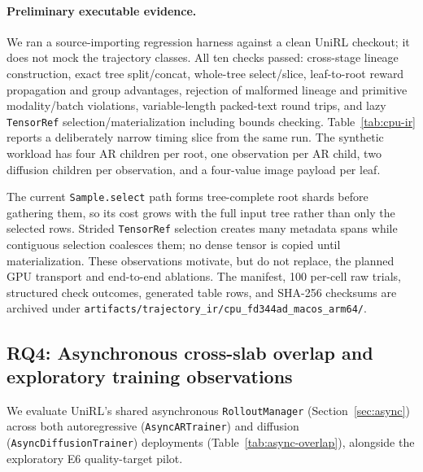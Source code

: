 \documentclass[10pt]{article}
\newcommand{\codepath}[1]{\texttt{#1}}
\begin{document}
\paragraph{Preliminary executable evidence.}
We ran a source-importing regression harness against a clean UniRL checkout; it does not mock the trajectory classes.
All ten checks passed: cross-stage lineage construction, exact tree split/concat,
whole-tree select/slice, leaf-to-root reward propagation and group advantages,
rejection of malformed lineage and primitive modality/batch violations, variable-length packed-text
round trips, and lazy \texttt{TensorRef} selection/materialization including bounds
checking.
Table~\ref{tab:cpu-ir} reports a deliberately narrow timing slice from the same run.
The synthetic workload has four AR children per root, one observation per AR child,
two diffusion children per observation, and a four-value image payload per leaf.

\begin{table}[H]
\caption{Preliminary single-process CPU trajectory-IR timings (microseconds).
Python 3.12.13 and PyTorch 2.11.0; one thread; ten warm-up and 100 measured repetitions.
These are regression measurements, not distributed or GPU throughput.}
\label{tab:cpu-ir}
\centering
\scriptsize

\end{table}

The current \texttt{Sample.select} path forms tree-complete root shards before
gathering them, so its cost grows with the full input tree rather than only the
selected rows. Strided \texttt{TensorRef} selection creates many metadata spans
while contiguous selection coalesces them; no dense tensor is copied until
materialization. These observations motivate, but do not replace, the planned
GPU transport and end-to-end ablations. The manifest, 100 per-cell raw trials,
structured check outcomes, generated table rows, and SHA-256 checksums are archived
under \codepath{artifacts/trajectory\_ir/cpu\_fd344ad\_macos\_arm64/}.

\subsection{RQ4: Asynchronous cross-slab overlap and exploratory training observations}
\label{sec:rq4}

We evaluate UniRL's shared asynchronous \texttt{RolloutManager} (Section~\ref{sec:async}) across both autoregressive (\texttt{AsyncARTrainer}) and diffusion (\texttt{AsyncDiffusionTrainer}) deployments (Table~\ref{tab:async-overlap}), alongside the exploratory E6 quality-target pilot.
\end{document}
